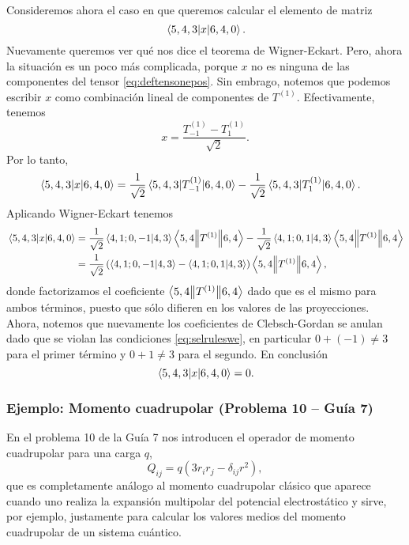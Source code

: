 \documentclass[10pt, a4paper]{article}
\numberwithin{equation}{subsection}
\begin{document}
Consideremos ahora el caso en que queremos calcular el elemento de matriz
\begin{equation}
  \matrixel{5,4,3}{x}{6,4,0}.
\end{equation}
Nuevamente queremos ver qué nos dice el teorema de Wigner-Eckart. Pero, ahora
la situación es un poco más complicada, porque $x$ no es ninguna de las componentes
del tensor \eqref{eq:deftensonepos}. Sin embrago, notemos que podemos escribir
$x$ como combinación lineal de componentes de $T^{(1)}$. Efectivamente,
tenemos
\begin{equation}
  x = \frac{T^{(1)}_{-1} - T^{(1)}_{1}}{\sqrt{2}}.
\end{equation}
Por lo tanto,
\begin{align}
  \matrixel{5,4,3}{x}{6,4,0} &=
  \frac{1}{\sqrt{2}}\matrixel{5,4,3}{T^{(1)}_{-1}}{6,4,0} -
  \frac{1}{\sqrt{2}}\matrixel{5,4,3}{T^{(1)}_{1}}{6,4,0}.
\end{align}
Aplicando Wigner-Eckart tenemos
\begin{align}
  \matrixel{5,4,3}{x}{6,4,0} &=
    \frac{1}{\sqrt{2}}\braket{4,1;0,-1}{4,3} \doublebarmel{5,4}{T^{(1)}}{6,4} -
    \frac{1}{\sqrt{2}}\braket{4,1;0,1}{4,3} \doublebarmel{5,4}{T^{(1)}}{6,4}
    \nonumber \\
  &=  \frac{1}{\sqrt{2}}\left(\braket{4,1;0,-1}{4,3} -
    \braket{4,1;0,1}{4,3}\right) \doublebarmel{5,4}{T^{(1)}}{6,4},
\end{align}
donde factorizamos el coeficiente $\left\langle{5,4}\middle\|{T^{(1)}}\middle\|{6,4}\right\rangle$ dado que
es el mismo para ambos términos, puesto que sólo difieren en los valores de las
proyecciones. Ahora, notemos que nuevamente los coeficientes de Clebsch-Gordan
se anulan dado que se violan las condiciones \eqref{eq:selruleswe}, en
particular $0 + (-1) \neq 3$ para el primer término y $0 + 1 \neq 3$ para el
segundo. En conclusión
\begin{equation}
  \matrixel{5,4,3}{x}{6,4,0} = 0.
\end{equation}

\subsubsection{Ejemplo: Momento cuadrupolar (Problema 10 -- Guía 7)}

En el problema 10 de la Guía 7 nos introducen el operador de momento
cuadrupolar para una carga $q$,
\begin{equation} \label{eq:def:momentocuadrupolar}
  Q_{ij} = q\left(3r_ir_j - \delta_{ij}r^2\right),
\end{equation}
que es completamente análogo al momento cuadrupolar clásico que aparece cuando
uno realiza la expansión multipolar del potencial electrostático y sirve, por
ejemplo, justamente para calcular los valores medios del momento cuadrupolar de
un sistema cuántico.
\end{document}
